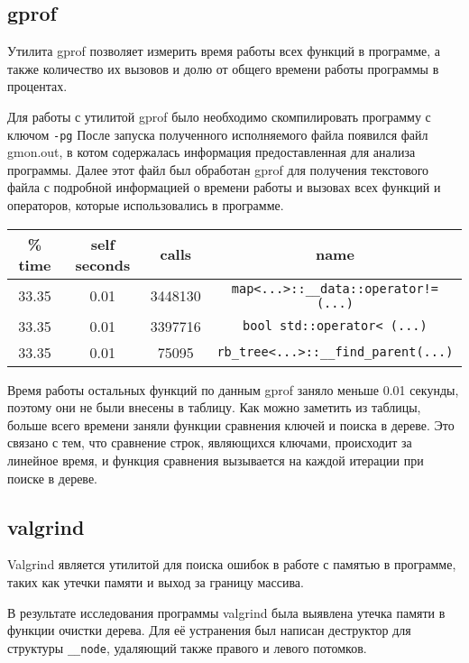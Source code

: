 \documentclass[12pt]{article}
\begin{document}
\subsection*{gprof}

Утилита gprof позволяет измерить время работы всех функций в программе, 
а также количество их вызовов и долю от общего времени работы программы в процентах.

Для работы с утилитой gprof было необходимо скомпилировать программу с ключом \texttt{-pg}
После запуска полученного исполняемого файла появился файл gmon.out, в котом содержалась информация
предоставленная для анализа программы. Далее этот файл был обработан gprof для получения текстового
файла с подробной информацией о времени работы и вызовах всех функций и операторов,
которые использовались в программе.

\begin{tabular}{ | c | c | c | c | }
    \hline
        \% time & self seconds & calls & name \\
        \hline 
        33.35 & 0.01 & 3448130 & \texttt{map<...>::\_\_data::operator!=(...)} \\
        33.35 & 0.01 & 3397716 & \texttt{bool std::operator< (...)} \\
        33.35 & 0.01 & 75095 & \texttt{rb\_tree<...>::\_\_find\_parent(...)}\\
    \hline
\end{tabular}

Время работы остальных функций по данным gprof заняло меньше 0.01 секунды, поэтому они не были внесены в таблицу.
Как можно заметить из таблицы, больше всего времени заняли функции сравнения ключей и поиска в дереве.
Это связано с тем, что сравнение строк, являющихся ключами, происходит за линейное время, и функция
сравнения вызывается на каждой итерации при поиске в дереве.

\subsection*{valgrind}

Valgrind является утилитой для поиска ошибок в работе с памятью в программе, таких
как утечки памяти и выход за границу массива.

В результате исследования программы valgrind была выявлена утечка памяти в функции очистки дерева. Для её устранения был написан деструктор для структуры \texttt{\_\_node}, 
удаляющий также правого и левого потомков.
\end{document}
